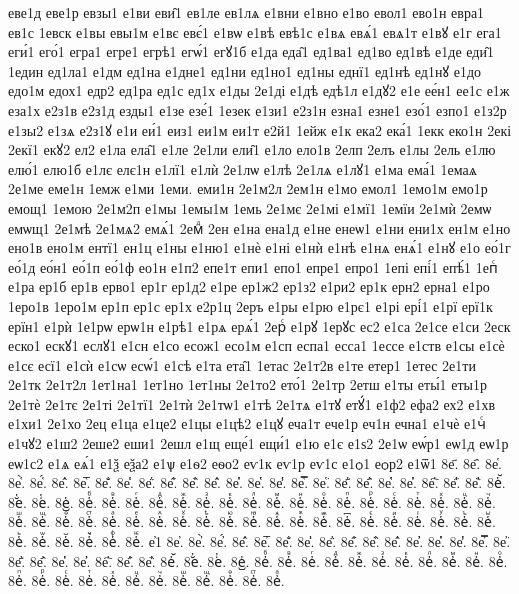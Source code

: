 {еве1д
еве1р
евзы1
е1ви
еви̑1
ев1ле
ев1лѧ
е1вни
е1вно
е1во
евол1
ево1н
евра1
ев1с
1евск
е1вы
евы1м
е1вє
евє́1
е1вѡ
е1вѣ
евѣ1с
е1вѧ
евѧ́1
евѧ1т
е1вꙋ
е1г
ега1
еги́1
его́1
егра1
егре1
егрѣ1
егѡ́1
егꙋ1б
е1да
еда̑1
ед1ва1
ед1во
ед1вѣ
е1де
еди̑1
1един
ед1ла1
е1дм
ед1на
е1дне1
ед1ни
ед1но1
ед1ны
еднї1
ед1нѣ
ед1нꙋ
е1до
едо1м
едох1
едр2
ед1ра
ед1с
ед1х
е1ды
2е1ді
е1дѣ
едѣ1л
е1дꙋ2
е1е
ее́н1
ее1с
е1ж
еза1х
е2з1в
е2з1д
езды1
е1зе
езе́1
1езек
е1зи1
е2з1н
езна1
езне1
езо́1
езпо1
е1з2р
е1зы2
е1зѧ
е2з1ꙋ
е1и
еи́1
еиз1
еи1м
еи1т
е2й1
1ейж
е1к
ека2
ека́1
1екк
еко1н
2екі
2екї1
екꙋ2
ел2
е1ла
ела̑1
е1ле
2е1ли
ели̑1
е1ло
ело1в
2елп
2елъ
е1лы
2ель
е1лю
елю́1
елю1б
е1лє
елє1н
е1лї1
е1лѝ
2е1лѡ
е1лѣ
2е1лѧ
е1лꙋ1
е1ма
ема́1
1емаѧ
2е1ме
еме1н
1емж
е1ми
1еми.
еми1н
2е1м2л
2ем1н
е1мо
емол1
1емо1м
емо1р
емощ1
1емою
2е1м2п
е1мы
1емы1м
1емь
2е1мє
2е1мі
е1мї1
1емїи
2е1мѝ
2емѡ
емѡщ1
2е1мѣ
2е1мѧ2
емѧ́1
2емⷣ
2ен
е1на
ена1д
е1не
енеѡ1
е1ни
ени1х
ен1м
е1но
ено1в
ено1м
ентї1
ен1ц
е1ны
е1ню1
е1нѐ
е1ні
е1нѝ
е1нѣ
е1нѧ
енѧ́1
е1нꙋ
е1о
ео́1г
ео́1д
ео́н1
ео́1п
ео́1ф
ео1н
е1п2
епе1т
епи1
епо1
епре1
епро1
1епі
епі́1
епѣ́1
1епⷭ
е1ра
ер1б
ер1в
ерво1
ер1г
ер1д2
е1ре
ер1ж2
ер1з2
е1ри2
ер1к
ерн2
ерна1
е1ро
1еро1в
1еро1м
ер1п
ер1с
ер1х
е2р1ц
2еръ
е1ры
е1рю
е1рє1
е1рі
ері́1
е1рї
ерї1к
ерїн1
е1рѝ
1е1рѡ
ерѡ1н
е1рѣ1
е1рѧ
ерѧ́1
2ерⷭ
е1рꙋ
1ерꙋс
ес2
е1са
2е1се
е1си
2еск
еско1
ескꙋ1
еслꙋ1
е1сн
е1со
есож1
есо1м
е1сп
еспа1
есса1
1ессе
е1ств
е1сы
е1сѐ
е1сє
есї1
е1сѝ
е1сѡ
есѡ́1
е1сѣ
е1та
ета̑1
1етас
2е1т2в
е1те
етер1
1етес
2е1ти
2е1тк
2е1т2л
1ет1на1
1ет1но
1ет1ны
2е1то2
ето́1
2е1тр
2етш
е1ты
еты́1
еты1р
2е1тѐ
2е1тє
2е1ті
2е1тї1
2е1тѝ
2е1тѡ1
е1тѣ
2е1тѧ
е1тꙋ
етꙋ́1
е1ф2
ефа2
ех2
е1хв
е1хи1
2е1хо
2ец
е1ца
е1це2
е1цы
е1цѣ2
е1цꙋ
еча1т
ече1р
еч1н
ечна1
е1чѐ
е1чⷭ
е1чꙋ2
е1ш2
2еше2
еши1
2ешл
е1щ
еще́1
ещи́1
е1ю
е1є
е1ѕ2
2е1ѡ
еѡ́р1
еѡ1д
еѡ1р
еѡ1с2
е1ѧ
еѧ́1
е1ѯ
еѯа2
е1ѱ
е1ѳ2
еѳо2
еѵ1к
еѵ1р
еѵ1с
е1ѻ1
еѻр2
е1ѿ1
8е҃.
8е҄.
8е҅.
8е҅̀.
8е҅́.
8е҅̂.
8е҅̅.
8е҅̆.
8е҅̇.
8е҅̈.
8е҅̋.
8е҅̏.
8е҅̑.
8е҅̓.
8е҅̔.
8е҅̾.
8е҅̿.
8е҅͘.
8е҅҃.
8е҅҄.
8е҅҅.
8е҅҆.
8е҅҇.
8е҅᷀.
8е҅᷁.
8е҅᷶.
8е᷷҅.
8е᷸҅.
8е᷹҅.
8е҅ⷠ.
8е҅ⷡ.
8е҅ⷢ.
8е҅ⷣ.
8е҅ⷤ.
8е҅ⷥ.
8е҅ⷦ.
8е҅ⷧ.
8е҅ⷨ.
8е҅ⷩ.
8е҅ⷪ.
8е҅ⷫ.
8е҅ⷬ.
8е҅ⷭ.
8е҅ⷮ.
8е҅ⷯ.
8е҅ⷰ.
8е҅ⷱ.
8е҅ⷲ.
8е҅ⷳ.
8е҅ⷴ.
8е҅ⷵ.
8е҅ⷶ.
8е҅ⷷ.
8е҅ⷸ.
8е҅ⷹ.
8е҅ⷺ.
8е҅ⷻ.
8е҅ⷼ.
8е҅ⷽ.
8е҅ⷾ.
8е҅ⷿ.
8е҅꙯.
8е҅ꙴ.
8е҅ꙵ.
8е҅ꙶ.
8е҅ꙷ.
8е҅ꙸ.
8е҅ꙹ.
8е҅ꙺ.
8е҅ꙻ.
8е҅꙼.
8е҅꙽.
8е҅ꚞ.
8е҅ꚟ.
е҆1
8е҆.
8е҆̀.
8е҆́.
8е҆̂.
8е҆̅.
8е҆̆.
8е҆̇.
8е҆̈.
8е҆̋.
8е҆̏.
8е҆̑.
8е҆̓.
8е҆̔.
8е҆̾.
8е҆̿.
8е҆͘.
8е҆҃.
8е҆҄.
8е҆҅.
8е҆҆.
8е҆҇.
8е҆᷀.
8е҆᷁.
8е҆᷶.
8е᷷҆.
8е᷸҆.
8е᷹҆.
8е҆ⷠ.
8е҆ⷡ.
8е҆ⷢ.
8е҆ⷣ.
8е҆ⷤ.
8е҆ⷥ.
8е҆ⷦ.
8е҆ⷧ.
8е҆ⷨ.
8е҆ⷩ.
8е҆ⷪ.
8е҆ⷫ.
8е҆ⷬ.
8е҆ⷭ.
8е҆ⷮ.
8е҆ⷯ.
8е҆ⷰ.
8е҆ⷱ.
8е҆ⷲ.
8е҆ⷳ.
8е҆ⷴ.
8е҆ⷵ.
8е҆ⷶ.
}
